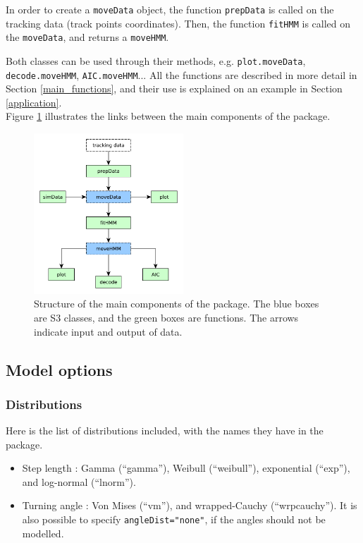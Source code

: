 \documentclass[]{article}
\begin{document}
In order to create a \texttt{moveData} object, the function \texttt{prepData} is called on the tracking data (track points coordinates). Then, the function \texttt{fitHMM} is called on the \texttt{moveData}, and returns a \texttt{moveHMM}.

Both classes can be used through their methods, e.g. \texttt{plot.moveData}, \texttt{decode.moveHMM}, \texttt{AIC.moveHMM}... All the functions are described in more detail in Section \ref{main_functions}, and their use is explained on an example in Section \ref{application}.\\

Figure \ref{struct} illustrates the links between the main components of the package.

\begin{figure}[h]
	\centering
	\includegraphics[width=0.5\textwidth]{pictures/struct}
	\caption{Structure of the main components of the package. The blue boxes are S3 classes, and the green boxes are functions. The arrows indicate input and output of data.}
	\label{struct}
\end{figure}

\subsection{Model options}

\subsubsection{Distributions}
Here is the list of distributions included, with the names they have in the package.
\begin{itemize}
	\item Step length : Gamma (``gamma''), Weibull (``weibull''), exponential (``exp''), and log-normal (``lnorm'').
	\item Turning angle : Von Mises (``vm''), and wrapped-Cauchy (``wrpcauchy''). It is also possible to specify \texttt{angleDist="none"}, if the angles should not be modelled.
\end{itemize}
\end{document}
